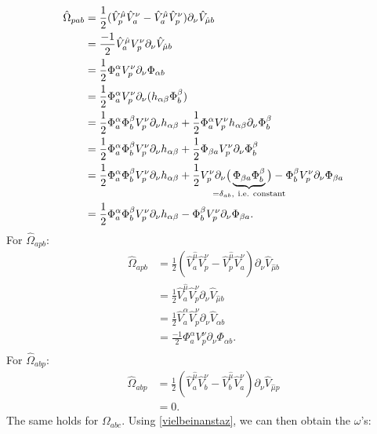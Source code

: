 \documentclass{article}
\begin{document}
\begin{align*}
    \hat \Omega_{pab} &= \frac{1}{2}(\hat V^{\hat \mu}_{  p} \hat V^{ \nu}_{a}-\hat V^{\hat \mu}_{a} \hat V^{ \nu}_{p})\partial_{ \nu} \hat V_{\hat \mu b}\\
    &= \frac{-1}{2}\hat V^{\hat \mu}_{a}  V^{ \nu}_{p}\partial_{ \nu} \hat V_{\hat \mu b}\\
    &= \frac{1}{2} \Phi^{ \alpha}_{a}  V^{ \nu}_{p}\partial_{ \nu}  \Phi_{\alpha b}\\
    &= \frac{1}{2} \Phi^{ \alpha}_{a}  V^{ \nu}_{p}\partial_{ \nu}( h_{\alpha \beta} \Phi^{\beta}_{ b})\\
    &= \frac{1}{2} \Phi^{ \alpha}_{a}  \Phi^{\beta}_{ b}V^{ \nu}_{p}\partial_{ \nu} h_{\alpha \beta}  +\frac{1}{2} \Phi^{ \alpha}_{a}  V^{ \nu}_{p}h_{\alpha \beta}\partial_{ \nu}  \Phi^{\beta}_{ b}\\
    &= \frac{1}{2} \Phi^{ \alpha}_{a}  \Phi^{\beta}_{ b}V^{ \nu}_{p}\partial_{ \nu} h_{\alpha \beta}  +\frac{1}{2} \Phi_{\beta a}  V^{ \nu}_{p}\partial_{ \nu}  \Phi^{\beta}_{ b}\\
    &= \frac{1}{2} \Phi^{ \alpha}_{a}  \Phi^{\beta}_{ b}V^{ \nu}_{p}\partial_{ \nu} h_{\alpha \beta}  +\frac{1}{2}   V^{ \nu}_{p}\partial_{ \nu} \big(\underbrace{\Phi_{\beta a} \Phi^{\beta}_{ b}}_{\mathclap{=\delta_{ab},\ \text{i.e. constant}}}\big) - \Phi^{\beta}_{ b} V^{ \nu}_{p}\partial_{ \nu} \Phi_{\beta a} \\
    &=\frac{1}{2} \Phi^{ \alpha}_{a}  \Phi^{\beta}_{ b}V^{ \nu}_{p}\partial_{ \nu} h_{\alpha \beta} - \Phi^{\beta}_{ b} V^{ \nu}_{p}\partial_{ \nu} \Phi_{\beta a}. 
\end{align*}
For $\hat \Omega_{apb}$:
\begin{align*}
    \hat \Omega_{apb} &= \frac{1}{2}(\hat V^{\hat \mu}_{  a} \hat V^{ \nu}_{p}-\hat V^{\hat \mu}_{p} \hat V^{ \nu}_{a})\partial_{ \nu} \hat V_{\hat \mu b}\\
    &= \frac{1}{2}\hat V^{\hat \mu}_{  a} \hat V^{ \nu}_{p}\partial_{ \nu} \hat V_{\hat \mu b}\\
    &= \frac{1}{2}\hat V^{\alpha}_{  a} \hat V^{ \nu}_{p}\partial_{ \nu} \hat V_{\alpha b}\\
    &= \frac{-1}{2} \Phi^{\alpha}_{  a}  V^{ \nu}_{p}\partial_{ \nu} \Phi_{\alpha b}.\\
\end{align*}
For $\hat \Omega_{abp}$:
\begin{align*}
    \hat \Omega_{abp} &= \frac{1}{2}(\hat V^{\hat \mu}_{  a} \hat V^{ \nu}_{b}-\hat V^{\hat \mu}_{b} \hat V^{ \nu}_{a})\partial_{ \nu} \hat V_{\hat \mu p}\\
    &= 0.
\end{align*}
The same holds for $\Omega_{abc}$. Using \eqref{vielbeinanstaz}, we can then obtain the $\omega$'s:
\end{document}

